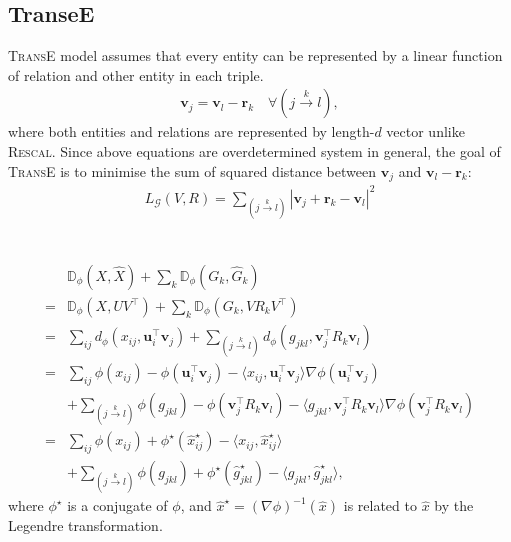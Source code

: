 \documentclass{article} %
\theoremstyle{definition}
\newcommand\ts{\mathcal} %
\newcommand\mt{} %
\newcommand\vt{\mathbf} %
\newcommand\triple[3]{(#1 \stackrel{#2}\rightarrow #3)}
\begin{document}
\subsection*{TranseE}
\textsc{TransE} model assumes that every entity can be represented by a linear function of relation and other entity in each triple.
\begin{align}
\vt{v}_j =  \vt{v}_l -\vt{r}_k \quad \forall \triple{j}{k}{l},
\end{align}
where both entities and relations are represented by length-$d$ vector unlike \textsc{Rescal}.
Since above equations are overdetermined system in general, the goal of \textsc{TransE} is to minimise the sum of squared distance between $\vt{v}_j$ and $\vt{v}_l -\vt{r}_k$:
\begin{align}
L_\ts{G}(\mt{V}, \mt{R}) = \sum_{\triple{j}{k}{l}}|\vt{v}_j + \vt{r}_k - \vt{v}_l|^2
\end{align}

\section{}

\begin{align}
&\mathbb{D}_{\phi}(\mt{X}, \hat{X}) + \sum_k \mathbb{D}_{\phi}(\mt{G}_k, \hat{G}_k)\\
=&\mathbb{D}_{\phi}(\mt{X}, \mt{U}\mt{V}^\top) + \sum_k \mathbb{D}_{\phi}(\mt{G}_k, \mt{V}\mt{R}_k\mt{V}^\top)\\
=& \sum_{ij} d_\phi(x_{ij}, \vt{u}_i^\top \vt{v}_j) + \sum_{\triple{j}{k}{l}} d_\phi(g_{jkl}, \vt{v}_j^\top R_k \vt{v}_l)\\
=& \sum_{ij} \phi(x_{ij}) - \phi(\vt{u}_i^\top \vt{v}_j) - \langle x_{ij}, \vt{u}_i^\top \vt{v}_j \rangle \nabla\phi(\vt{u}_i^\top \vt{v}_j) \\
&+ \sum_{\triple{j}{k}{l}} \phi(g_{jkl}) - \phi(\vt{v}_j^\top R_k \vt{v}_l) - \langle g_{jkl}, \vt{v}_j^\top R_k \vt{v}_l \rangle \nabla\phi(\vt{v}_j^\top R_k \vt{v}_l)\\
=& \sum_{ij} \phi(x_{ij}) + \phi^\star(\hat{x}_{ij}^\star) - \langle x_{ij}, \hat{x}_{ij}^\star \rangle \\
&+ \sum_{\triple{j}{k}{l}} \phi(g_{jkl}) + \phi^\star(\hat{g}_{jkl}^\star) - \langle g_{jkl}, \hat{g}_{jkl}^\star\rangle ,
\end{align}
where $\phi^\star$ is a conjugate of $\phi$, and $\hat{x}^\star = (\nabla \phi)^{-1}(\hat{x})$ is related to $\hat{x}$ by the Legendre transformation.
\end{document}
